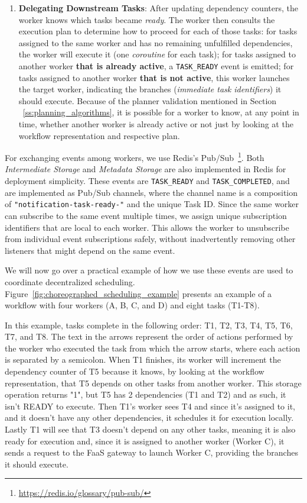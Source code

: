 \begin{enumerate}
    \item \textbf{Delegating Downstream Tasks}: After updating dependency counters, the worker knows which tasks became \textit{ready}. The worker then consults the execution plan to determine how to proceed for each of those tasks: for tasks assigned to the same worker and has no remaining unfulfilled dependencies, the worker will execute it (one \textit{coroutine} for each task); for tasks assigned to another worker \textbf{that is already active}, a \texttt{TASK\_READY} event is emitted; for tasks assigned to another worker \textbf{that is not active}, this worker launches the target worker, indicating the branches (\textit{immediate task identifiers}) it should execute. Because of the planner validation mentioned in Section ~\ref{ss:planning_algorithms}, it is possible for a worker to know, at any point in time, whether another worker is already active or not just by looking at the workflow representation and respective plan.
\end{enumerate}

For exchanging events among workers, we use Redis's Pub/Sub~\footnote{\url{https://redis.io/glossary/pub-sub/}}. Both \textit{Intermediate Storage} and \textit{Metadata Storage} are also implemented in Redis for deployment simplicity. These events are \texttt{TASK\_READY} and \texttt{TASK\_COMPLETED}, and are implemented as Pub/Sub channels, where the channel name is a composition of \texttt{"notification-task-ready-"} and the unique Task ID. Since the same worker can subscribe to the same event multiple times, we assign unique subscription identifiers that are local to each worker. This allows the worker to unsubscribe from individual event subscriptions safely, without inadvertently removing other listeners that might depend on the same event. 

We will now go over a practical example of how we use these events are used to coordinate decentralized scheduling. Figure~\ref{fig:choreographed_scheduling_example} presents an example of a workflow with four workers (A, B, C, and D) and eight tasks (T1-T8).

In this example, tasks complete in the following order: T1, T2, T3, T4, T5, T6, T7, and T8. The text in the arrows represent the order of actions performed by the worker who executed the task from which the arrow starts, where each action is separated by a semicolon. When T1 finishes, its worker will increment the dependency counter of T5 because it knows, by looking at the workflow representation, that T5 depends on other tasks from another worker. This storage operation returns "1", but T5 has 2 dependencies (T1 and T2) and as such, it isn't READY to execute. Then T1's worker sees T4 and since it's assigned to it, and it doesn't have any other dependencies, it schedules it for execution locally. Lastly T1 will see that T3 doesn't depend on any other tasks, meaning it is also ready for execution and, since it is assigned to another worker (Worker C), it sends a request to the FaaS gateway to launch Worker C, providing the branches it should execute.

